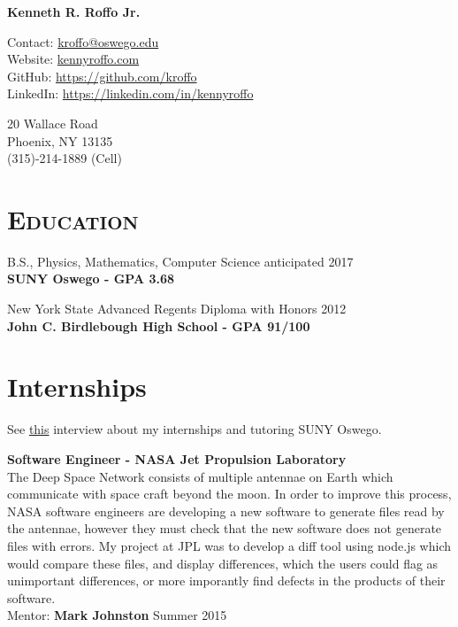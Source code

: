 \documentclass[8pt]{article}
\def\name{Kenneth R. Roffo Jr.}
\renewenvironment{itemize}{
  \begin{list}{}{
    \setlength{\leftmargin}{1.5em}
  }
}{
  \end{list}
}
\begin{document}
{\huge \bf \name}


Contact: \href{mailto:kroffo@oswego.edu}{kroffo@oswego.edu}\\
Website: \href{http://kennyroffo.com}{kennyroffo.com}\\
GitHub: \href{https://github.com/kroffo}{https://github.com/kroffo}\\
LinkedIn: \href{https://www.linkedin.com/in/kennyroffo}{https://linkedin.com/in/kennyroffo}

\vspace{0.10in}

20 Wallace Road \\
Phoenix, NY 13135 \\
(315)-214-1889 (Cell)


\section*{\textsc{Education}}

\begin{itemize}
  \item B.S., Physics, Mathematics, Computer Science \hfill anticipated 2017\\
  \textbf{SUNY Oswego - GPA 3.68}
  \item New York State Advanced Regents Diploma with Honors \hfill 2012\\
  \textbf{John C. Birdlebough High School - GPA 91/100}
  \end{itemize}	

\section*{Internships} See \href{https://www.youtube.com/watch?v=BiJOjhm_ov4}{this} interview about my internships and tutoring SUNY Oswego.
\begin{itemize}
\item \textbf{Software Engineer - NASA Jet Propulsion Laboratory}\\
  The Deep Space Network consists of multiple antennae on Earth which communicate with space craft beyond the moon. In order to improve this process, NASA software engineers are developing a new software to generate files read by the antennae, however they must check that the new software does not generate files with errors. My project at JPL was to develop a diff tool using node.js which would compare these files, and display differences, which the users could flag as unimportant differences, or more imporantly find defects in the products of their software.\\
  Mentor: \textbf{Mark Johnston} \hfill Summer 2015


\end{itemize}
\end{document}
